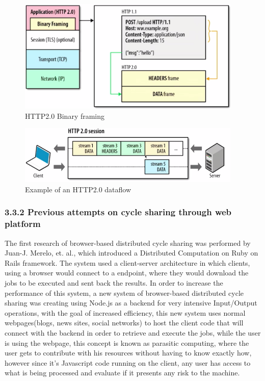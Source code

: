\begin{figure}[htbp]
  \centering
  \includegraphics[width=0.95\textwidth]{img/http2binaryframing.png}
  \caption{HTTP2.0 Binary framing}
  \label{fig:binaryframing}
\end{figure}

\begin{figure}[htbp]
  \centering
  \includegraphics[width=0.95\textwidth]{img/http2dataflow.png}
  \caption{Example of an HTTP2.0 dataflow}
  \label{fig:http2dataflow}
\end{figure}


\subsubsection{3.3.2 Previous attempts on cycle sharing through web platform}
The first research of browser-based distributed cycle sharing was performed by Juan-J. Merelo, et. al., which introduced a Distributed Computation on Ruby on Rails framework\cite{Merelo2007}. The system used a client-server architecture in which clients, using a browser would connect to a endpoint, where they would download the jobs to be executed and sent back the results. In order to increase the performance of this system, a new system\cite{Duda2013} of browser-based distributed cycle sharing was creating using Node.js as a backend for very intensive Input/Output operations\cite{Tilkov2010}, with the goal of increased efficiency, this new system uses normal webpages(blogs, news sites, social networks) to host the client code that will connect with the backend in order to retrieve and execute the jobs, while the user is using the webpage, this concept is known as parasitic computing\cite{Barabasi2001}, where the user gets to contribute with his resources without having to know exactly how, however since it's Javascript code running on the client, any user has access to what is being processed and evaluate if it presents any risk to the machine.